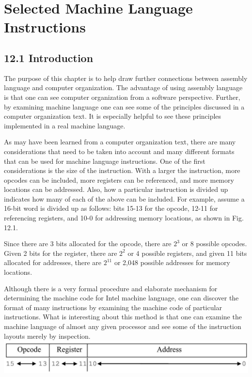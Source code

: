 \documentclass[10pt]{article}
\begin{document}
\section*{Selected Machine Language Instructions}
\subsection*{12.1 Introduction}
The purpose of this chapter is to help draw further connections between assembly language and computer organization. The advantage of using assembly language is that one can see computer organization from a software perspective. Further, by examining machine language one can see some of the principles discussed in a computer organization text. It is especially helpful to see these principles implemented in a real machine language.

As may have been learned from a computer organization text, there are many considerations that need to be taken into account and many different formats that can be used for machine language instructions. One of the first considerations is the size of the instruction. With a larger the instruction, more opcodes can be included, more registers can be referenced, and more memory locations can be addressed. Also, how a particular instruction is divided up indicates how many of each of the above can be included. For example, assume a 16-bit word is divided up as follows: bits 15-13 for the opcode, 12-11 for referencing registers, and 10-0 for addressing memory locations, as shown in Fig. 12.1.

Since there are 3 bits allocated for the opcode, there are $2^{3}$ or 8 possible opcodes. Given 2 bits for the register, there are $2^{2}$ or 4 possible registers, and given 11 bits allocated for addresses, there are $2^{11}$ or 2,048 possible addresses for memory locations.

Although there is a very formal procedure and elaborate mechanism for determining the machine code for Intel machine language, one can discover the format of many instructions by examining the machine code of particular instructions. What is interesting about this method is that one can examine the machine language of almost any given processor and see some of the instruction layouts merely by inspection.\\
\includegraphics[max width=\textwidth, center]{2025_03_24_ebe50cc223a6fbc49eecg-275}
\end{document}
